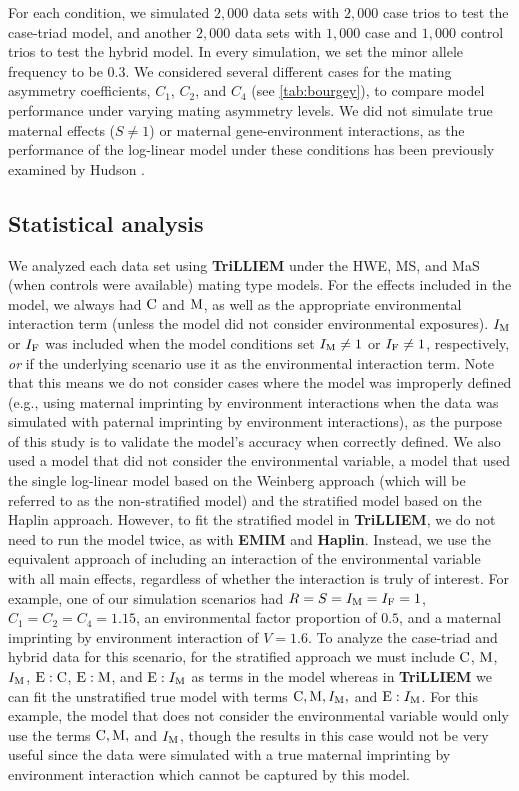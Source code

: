 For each condition, we simulated $2,000$ data sets with $2,000$ case trios to test the case-triad model, and another $2,000$ data sets with $1,000$ case and $1,000$ control trios to test the hybrid model.
In every simulation, we set the minor allele frequency to be $0.3$.
We considered several different cases for the mating asymmetry coefficients, $C_1$, $C_2$, and $C_4$ (see \cref{tab:bourgey}), to compare model performance under varying mating asymmetry levels.
We did not simulate true maternal effects ($S \neq 1$) or maternal gene-environment interactions, as the performance of the log-linear model under these conditions has been previously examined by Hudson \cite{Huds19}.

\subsection{Statistical analysis}

We analyzed each data set using \textbf{TriLLIEM} under the HWE, MS, and MaS (when controls were available) mating type models.
For the effects included in the model, we always had ${\rm C}$ and ${\rm M}$, as well as the appropriate environmental interaction term (unless the model did not consider environmental exposures).
$I_{{\rm M}}$ or $I_{{\rm F}}$ was included when the model conditions set $I_{{\rm M}} \not = 1$ or $I_{{\rm F}} \not = 1$, respectively, \emph{or} if the underlying scenario use it as the environmental interaction term.
Note that this means we do not consider cases where the model was improperly defined (e.g., using maternal imprinting by environment interactions when the data was simulated with paternal imprinting by environment interactions), as the purpose of this study is to validate the model's accuracy when correctly defined.
We also used a model that did not consider the environmental variable, a model that used the single log-linear model based on the Weinberg approach (which will be referred to as the non-stratified model) and the stratified model based on the Haplin approach.
However, to fit the stratified model in \textbf{TriLLIEM}, we do not need to run the model twice, as with \textbf{EMIM} and \textbf{Haplin}.
Instead, we use the equivalent approach of including an interaction of the environmental variable with all main effects, regardless of whether the interaction is truly of interest.
For example, one of our simulation scenarios had $R=S=I_{{\rm M}}=I_{{\rm F}}=1$, $C_1 = C_2 = C_4 = 1.15$, an environmental factor proportion of $0.5$, and a maternal imprinting by environment interaction of $V = 1.6$.
To analyze the case-triad and hybrid data for this scenario, for the stratified approach we must include ${\rm C}$, ${\rm M}$, $I_{{\rm M}}$, ${\rm E}:{\rm C}$, ${\rm E}:{\rm M}$, and ${\rm E}:I_{{\rm M}}$ as terms in the model whereas in \textbf{TriLLIEM} we can fit the unstratified true model with terms ${\rm C}, {\rm M}, I_{{\rm M}},$ and ${\rm E}:I_{{\rm M}}$.
For this example, the model that does not consider the environmental variable would only use the terms ${\rm C}, {\rm M},$ and $I_{{\rm M}}$, though the results in this case would not be very useful since the data were simulated with a true maternal imprinting by environment interaction which cannot be captured by this model.

